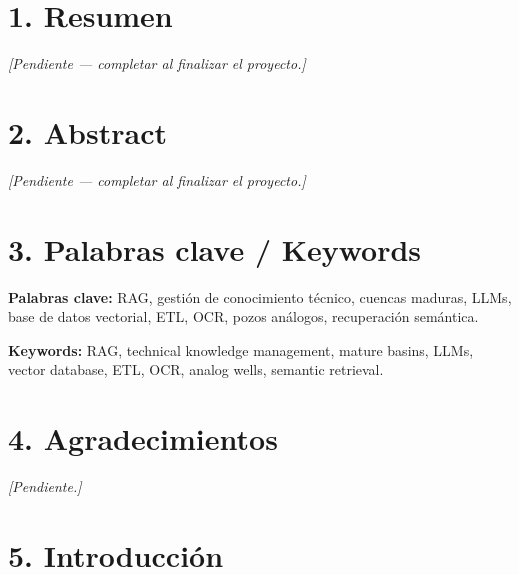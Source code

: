 \documentclass[12pt, a4paper]{report}
\begin{document}
\tableofcontents
\newpage

\chapter*{1. Resumen}

\textit{[Pendiente --- completar al finalizar el proyecto.]}

\chapter*{2. Abstract}

\textit{[Pendiente --- completar al finalizar el proyecto.]}

\chapter*{3. Palabras clave / Keywords}

\textbf{Palabras clave:} RAG, gestión de conocimiento técnico, cuencas maduras, LLMs,
base de datos vectorial, ETL, OCR, pozos análogos, recuperación semántica.

\textbf{Keywords:} RAG, technical knowledge management, mature basins, LLMs,
vector database, ETL, OCR, analog wells, semantic retrieval.

\chapter*{4. Agradecimientos}

\textit{[Pendiente.]}

\chapter*{5. Introducción}
\end{document}
